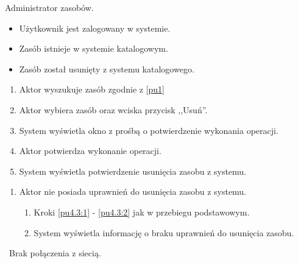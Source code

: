 Administrator zasobów.

\begin{itemize}
\item Użytkownik jest zalogowany w systemie.
\item Zasób istnieje w systemie katalogowym.
\end{itemize}

\begin{itemize}
\item Zasób został usunięty z systemu katalogowego.
\end{itemize}

\begin{enumerate}
\item \label{pu4.3:1} Aktor wyszukuje zasób zgodnie z \ref{pu1}
\item \label{pu4.3:2} Aktor wybiera zasób oraz wciska przycisk ,,Usuń''.
\item System wyświetla okno z prośbą o potwierdzenie wykonania operacji.
\item Aktor potwierdza wykonanie operacji.
\item System wyświetla potwierdzenie usunięcia zasobu z systemu.
\end{enumerate}

\begin{enumerate}
\item Aktor nie posiada uprawnień do usunięcia zasobu z systemu.
	\begin{enumerate}[label*=\arabic*.]
		\item Kroki \ref{pu4.3:1} - \ref{pu4.3:2} jak w przebiegu podstawowym.
		\item System wyświetla informację o braku uprawnień do usunięcia zasobu.
	\end{enumerate}
\end{enumerate}

\
Brak połączenia z siecią.

